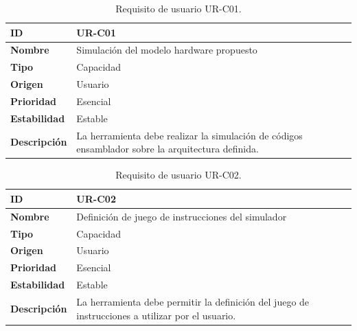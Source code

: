 \begin{center}
\begin{table}[htbp]
\centering
\begin{tabular}{@{}p{2.5cm} p{9cm}@{}} 
\toprule
\textbf{ID} 				& UR-C01 \\
\midrule
\textbf{Nombre} 			& Simulación del modelo hardware propuesto\\
\midrule
\textbf{Tipo} 			& Capacidad \\
\midrule
\textbf{Origen} 			& Usuario \\
\midrule
\textbf{Prioridad}		& Esencial \\
\midrule
\textbf{Estabilidad} 		& Estable \\
\midrule
\textbf{Descripción} 	& La herramienta debe realizar la simulación de códigos ensamblador sobre la arquitectura definida. \\
\bottomrule
\end{tabular}
\caption{Requisito de usuario UR-C01.}
\label{tab:urc01}
\end{table}
\end{center}

\begin{center}
\begin{table}[htbp]
\centering
\begin{tabular}{@{}p{2.5cm} p{9cm}@{}} 
\toprule
\textbf{ID} 				& UR-C02 \\
\midrule
\textbf{Nombre} 			& Definición de juego de instrucciones del simulador \\
\midrule
\textbf{Tipo} 			& Capacidad \\
\midrule
\textbf{Origen} 			& Usuario \\
\midrule
\textbf{Prioridad}		& Esencial \\
\midrule
\textbf{Estabilidad} 		& Estable \\
\midrule
\textbf{Descripción} 	& La herramienta debe permitir la definición del juego de instrucciones a utilizar por el usuario. \\
\bottomrule
\end{tabular}
\caption{Requisito de usuario UR-C02.}
\label{tab:urc02}
\end{table}
\end{center}

